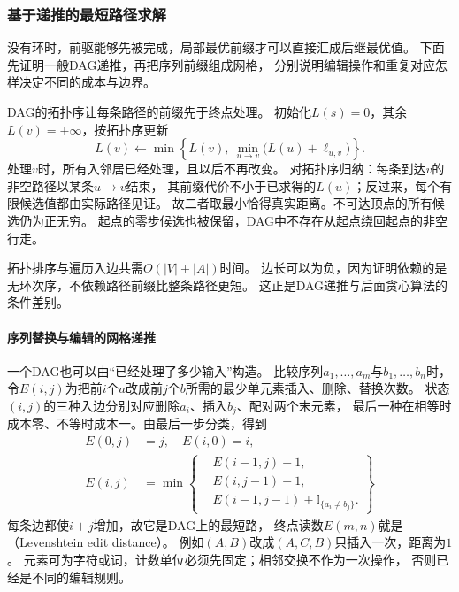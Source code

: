 \subsubsection{基于递推的最短路径求解}

没有环时，前驱能够先被完成，局部最优前缀才可以直接汇成后继最优值。
下面先证明一般DAG递推，再把序列前缀组成网格，
分别说明编辑操作和重复对应怎样决定不同的成本与边界。

DAG的拓扑序让每条路径的前缀先于终点处理。
初始化\(L(s)=0\)，其余\(L(v)=+\infty\)，按拓扑序更新
\[
  L(v)\leftarrow
  \min\left\{L(v),\ \min_{u\to v}\bigl(L(u)+\ell_{u,v}\bigr)\right\}.
\]
处理\(v\)时，所有入邻居已经处理，且以后不再改变。
对拓扑序归纳：每条到达\(v\)的非空路径以某条\(u\to v\)结束，
其前缀代价不小于已求得的\(L(u)\)；反过来，每个有限候选值都由实际路径见证。
故二者取最小恰得真实距离。不可达顶点的所有候选仍为正无穷。
起点的零步候选也被保留，DAG中不存在从起点绕回起点的非空行走。

拓扑排序与遍历入边共需\(O(|V|+|A|)\)时间。
边长可以为负，因为证明依赖的是无环次序，不依赖路径前缀比整条路径更短。
这正是DAG递推与后面贪心算法的条件差别。

\paragraph{序列替换与编辑的网格递推}
一个DAG也可以由“已经处理了多少输入”构造。
比较序列$a_1,\ldots,a_m$与$b_1,\ldots,b_n$时，
令$E(i,j)$为把前$i$个$a$改成前$j$个$b$所需的最少单元素插入、删除、替换次数。
状态$(i,j)$的三种入边分别对应删除$a_i$、插入$b_j$、配对两个末元素，
最后一种在相等时成本零、不等时成本一。由最后一步分类，得到
\begin{equation}
 \begin{aligned}
 E(0,j)&=j,\quad E(i,0)=i,\\
 E(i,j)&=\min\left\{\begin{aligned}
   &E(i-1,j)+1,\\
   &E(i,j-1)+1,\\
   &E(i-1,j-1)+\mathbb I_{\{a_i\neq b_j\}}.
 \end{aligned}\right\}
 \end{aligned}
 \label{eq:graph-edit-distance-recursion}
\end{equation}
每条边都使$i+j$增加，故它是DAG上的最短路，
终点读数$E(m,n)$就是（Levenshtein edit distance）。
例如$(A,B)$改成$(A,C,B)$只插入一次，距离为$1$。
元素可为字符或词，计数单位必须先固定；相邻交换不作为一次操作，
否则已经是不同的编辑规则。

